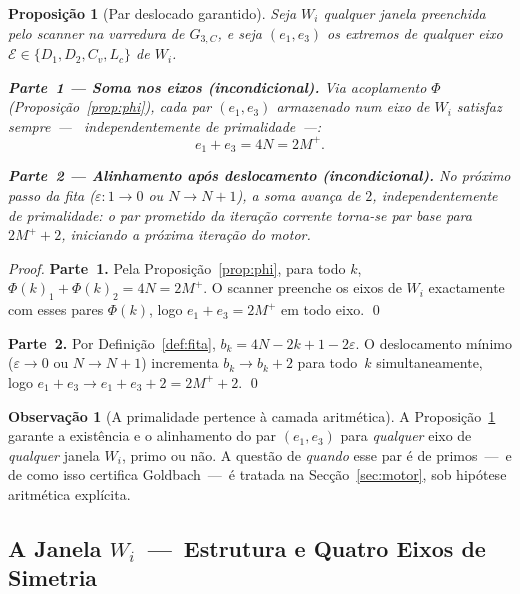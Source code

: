 \documentclass[12pt, a4paper]{article}
\theoremstyle{plain}
\newtheorem{proposition}[theorem]{Proposição}
\theoremstyle{definition}
\newtheorem{remark}[theorem]{Observação}
\theoremstyle{remark}
\begin{document}
	\begin{proposition}[Par deslocado garantido]
		\label{prop:par-deslocado}
		Seja $W_i$ qualquer janela preenchida pelo scanner na varredura
		de $G_{3,C}$, e seja $(e_1,e_3)$ os extremos de qualquer eixo
		$\mathcal{E}\in\{D_1,D_2,C_v,L_c\}$ de $W_i$.
		
		\medskip
		\textbf{Parte~1 --- Soma nos eixos (incondicional).}
		Via acoplamento $\Phi$ (Proposição~\ref{prop:phi}), cada par
		$(e_1,e_3)$ armazenado num eixo de $W_i$ satisfaz sempre~---~
		independentemente de primalidade~---:
		\[
		e_1 + e_3 = 4N = 2M^+.
		\]
		
		\medskip
		\textbf{Parte~2 --- Alinhamento após deslocamento (incondicional).}
		No próximo passo da fita ($\varepsilon:1\to0$ ou $N\to N+1$),
		a soma avança de $2$, independentemente de primalidade:
		o par prometido da iteração corrente torna-se par base para
		$2M^++2$, iniciando a próxima iteração do motor.
	\end{proposition}
	
	\begin{proof}
		\textbf{Parte~1.}  Pela Proposição~\ref{prop:phi}, para todo $k$,
		$\Phi(k)_1+\Phi(k)_2=4N=2M^+$.  O scanner preenche os eixos de
		$W_i$ exactamente com esses pares $\Phi(k)$, logo
		$e_1+e_3=2M^+$ em todo eixo. \qed
		
		\textbf{Parte~2.}  Por Definição~\ref{def:fita},
		$b_k=4N-2k+1-2\varepsilon$.  O deslocamento mínimo
		($\varepsilon\to0$ ou $N\to N+1$) incrementa $b_k\to b_k+2$ para
		todo~$k$ simultaneamente, logo $e_1+e_3\to e_1+e_3+2=2M^++2$. \qed
	\end{proof}
	
	\begin{remark}[A primalidade pertence à camada aritmética]
		A Proposição~\ref{prop:par-deslocado} garante a existência e o
		alinhamento do par $(e_1,e_3)$ para \emph{qualquer} eixo de
		\emph{qualquer} janela $W_i$, primo ou não.  A questão de
		\emph{quando} esse par é de primos~---~e de como isso certifica
		Goldbach~---~é tratada na Secção~\ref{sec:motor}, sob hipótese
		aritmética explícita.
	\end{remark}
	
	\subsection{A Janela $W_i$~---~Estrutura e Quatro Eixos de Simetria}
	\label{subsec:Wi-estrutura}
	
\end{document}
